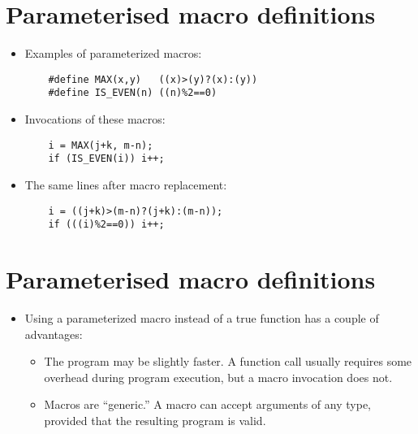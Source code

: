 \documentclass{article}
\begin{document}
\section{Parameterised macro definitions}
\begin{itemize}
\item Examples of parameterized macros:
\begin{Verbatim}
	#define MAX(x,y)   ((x)>(y)?(x):(y))
	#define IS_EVEN(n) ((n)%2==0)
\end{Verbatim}

\item Invocations of these macros:
\begin{Verbatim}
	i = MAX(j+k, m-n);
	if (IS_EVEN(i)) i++;
\end{Verbatim}

\item The same lines after macro replacement:
\begin{Verbatim}
	i = ((j+k)>(m-n)?(j+k):(m-n));
	if (((i)%2==0)) i++;
\end{Verbatim}
\end{itemize}



\section{Parameterised macro definitions}
\begin{itemize}
\item Using a parameterized macro instead of a true function has a couple of advantages:

\begin{itemize}
\item The program may be slightly faster. A function call usually requires some overhead during program execution, but a macro invocation does not.
\item Macros are ``generic.'' A macro can accept arguments of any type, provided that the resulting program is valid.
\end{itemize}
\end{itemize}
\end{document}
